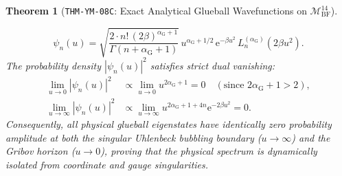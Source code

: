 \documentclass[11pt,a4paper,reqno]{article}
\theoremstyle{plain}
\newtheorem{theorem}{Theorem}[section]
\theoremstyle{definition}
\theoremstyle{remark}
\numberwithin{equation}{section}
\begin{document}
\begin{theorem}[\texttt{THM-YM-08C}: Exact Analytical Glueball Wavefunctions on $\mathcal{M}_{\mathrm{BF}}^{14}$]
\begin{enumerate}[label=\textbf{(\roman*)}, leftmargin=2.0em]
  \begin{equation}
    \psi_n(u) = \sqrt{\frac{2 \cdot n! \, (2\beta)^{\alpha_{\mathrm{G}}+1}}{\Gamma(n + \alpha_{\mathrm{G}} + 1)}} \, u^{\alpha_{\mathrm{G}} + 1/2} \, \mathrm{e}^{-\beta u^2} \, L_n^{(\alpha_{\mathrm{G}})}\left( 2\beta u^2 \right).
    \label{eq:glueball_wavefunction_closed_form}
  \end{equation}
  The probability density $|\psi_n(u)|^2$ satisfies strict dual vanishing:
  \begin{align}
    \lim_{u \to 0} |\psi_n(u)|^2 &\propto \lim_{u \to 0} u^{2\alpha_{\mathrm{G}} + 1} = 0 \quad (\text{since } 2\alpha_{\mathrm{G}} + 1 > 2), \label{eq:prob_zero_ir} \\
    \lim_{u \to \infty} |\psi_n(u)|^2 &\propto \lim_{u \to \infty} u^{2\alpha_{\mathrm{G}} + 1 + 4n} \mathrm{e}^{-2\beta u^2} = 0. \label{eq:prob_zero_uv}
  \end{align}
  Consequently, all physical glueball eigenstates have identically zero probability amplitude at both the singular Uhlenbeck bubbling boundary ($u \to \infty$) and the Gribov horizon ($u \to 0$), proving that the physical spectrum is dynamically isolated from coordinate and gauge singularities.
\end{enumerate}
\end{theorem}
\end{document}
